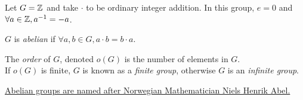 \begin{example}
Let $G={\mathbb{ Z}}$ and take $\cdot$ to be ordinary integer addition. In this group, $e=0$ and $\forall a \in {\mathbb{ Z}}, a^{-1}=-a$.
\end{example}
\begin{definition}
$G$ is \textit{abelian} if $\forall a,b\in G, a\cdot b= b\cdot a$.
\end{definition}
\begin{definition}
The \textit{order} of $G$, denoted $o(G)$ is the number of elements in $G$. \\ If $o(G)$ is finite, $G$ is known as a \textit{finite group}, otherwise $G$ is an \textit{infinite group}.
\end{definition}
\href{https://en.wikipedia.org/wiki/Niels_Henrik_Abel}{Abelian groups are named after Norwegian Mathematician Niels Henrik Abel.}
